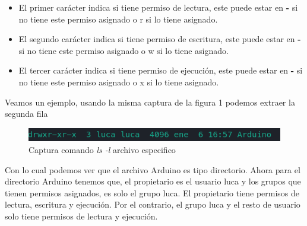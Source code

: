 \documentclass[12pt,a4paper]{article} %
\begin{document}
	\begin{itemize}
		\item El primer carácter indica si tiene permiso de lectura, este puede estar en \textbf{-} si no tiene este permiso asignado o r si lo tiene asignado.
		\item El segundo carácter indica si tiene permiso de escritura, este puede estar en \textbf{-} si no tiene este permiso asignado o w si lo tiene asignado.
		\item El tercer carácter indica si tiene permiso de ejecución, este puede estar en \textbf{-} si no tiene este permiso asignado o x si lo tiene asignado.
	\end{itemize}
	Veamos un ejemplo, usando la misma captura de la figura 1 podemos extraer la segunda fila\par
	\begin{figure}[h]
		\includegraphics[scale=1]{archivo_permisos}
		\centering
		\caption{Captura comando \textit{ls -l} archivo especifico}
	\end{figure}
	Con lo cual podemos ver que el archivo Arduino es tipo directorio. Ahora para el directorio Arduino tenemos que, el propietario es el usuario luca y los grupos que tienen permisos asignados, es solo el grupo luca. El propietario tiene permisos de lectura, escritura y ejecución. Por el contrario, el grupo luca y el resto de usuario solo tiene permisos de lectura y ejecución.
	\clearpage
\end{document}

